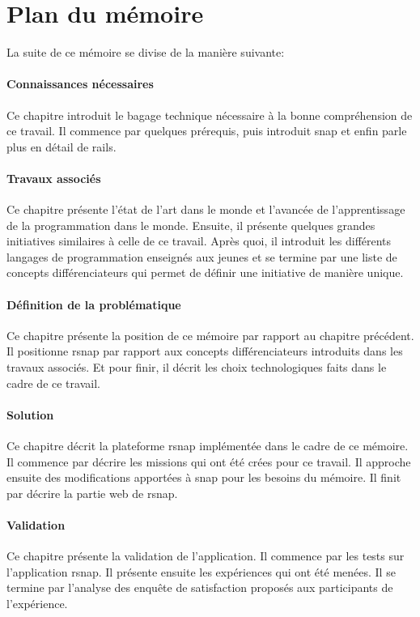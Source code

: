 \section{Plan du mémoire}
La suite de ce mémoire se divise de la manière suivante:

\paragraph{Connaissances nécessaires}
Ce chapitre introduit le bagage technique nécessaire à la bonne compréhension de ce travail. Il commence par quelques prérequis, puis introduit \gls{snap} et enfin parle plus en détail de \gls{rails}.

\paragraph{Travaux associés}
Ce chapitre présente l'état de l'art dans le monde et l'avancée de l'apprentissage de la programmation dans le monde. Ensuite, il présente quelques grandes initiatives similaires à celle de ce travail. Après quoi, il introduit les différents langages de programmation enseignés aux jeunes et se termine par une liste de concepts différenciateurs qui permet de définir une initiative de manière unique.

\paragraph{Définition de la problématique}
Ce chapitre présente la position de ce mémoire par rapport au chapitre précédent. Il positionne \gls{rsnap} par rapport aux concepts différenciateurs introduits dans les travaux associés. Et pour finir, il décrit les choix technologiques faits dans le cadre de ce travail.

\paragraph{Solution}
Ce chapitre décrit la plateforme \gls{rsnap} implémentée dans le cadre de ce mémoire.
Il commence par décrire les \glspl{mission} qui ont été crées pour ce travail. Il approche ensuite des modifications apportées à \gls{snap} pour les besoins du mémoire. Il finit par décrire la partie web de \gls{rsnap}.

\paragraph{Validation}
Ce chapitre présente la validation de l'application. Il commence par les tests sur l'application \gls{rsnap}. Il présente ensuite les expériences qui ont été menées. Il se termine par l'analyse des enquête de satisfaction proposés aux participants de l'expérience.

